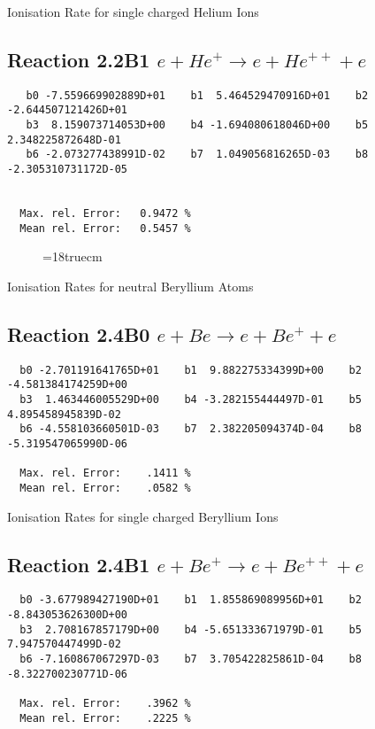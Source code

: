   Ionisation Rate for single charged Helium Ions

\subsection{
Reaction 2.2B1   $e + He^+ \rightarrow e + He^{++} + e$
}


\begin{verbatim}
   b0 -7.559669902889D+01    b1  5.464529470916D+01    b2 -2.644507121426D+01
   b3  8.159073714053D+00    b4 -1.694080618046D+00    b5  2.348225872648D-01
   b6 -2.073277438991D-02    b7  1.049056816265D-03    b8 -2.305310731172D-05


  Max. rel. Error:   0.9472 %
  Mean rel. Error:   0.5457 %

\end{verbatim}

\begin{figure} \label{2.2B}
\epsfxsize=18truecm
\end{figure}
\newpage

 Ionisation Rates for neutral Beryllium Atoms

\subsection{
Reaction 2.4B0   $e + Be \rightarrow e + Be^+ + e $
}

\begin{verbatim}
  b0 -2.701191641765D+01    b1  9.882275334399D+00    b2 -4.581384174259D+00
  b3  1.463446005529D+00    b4 -3.282155444497D-01    b5  4.895458945839D-02
  b6 -4.558103660501D-03    b7  2.382205094374D-04    b8 -5.319547065990D-06

  Max. rel. Error:    .1411 %
  Mean rel. Error:    .0582 %

\end{verbatim}

 Ionisation Rates for
 single charged Beryllium Ions

\subsection{
Reaction 2.4B1  $e + Be^+ \rightarrow e + Be^{++} + e $
}


\begin{verbatim}
  b0 -3.677989427190D+01    b1  1.855869089956D+01    b2 -8.843053626300D+00
  b3  2.708167857179D+00    b4 -5.651333671979D-01    b5  7.947570447499D-02
  b6 -7.160867067297D-03    b7  3.705422825861D-04    b8 -8.322700230771D-06

  Max. rel. Error:    .3962 %
  Mean rel. Error:    .2225 %

\end{verbatim}

